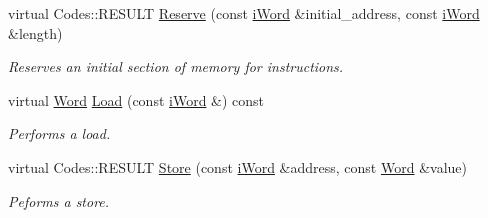\begin{DoxyCompactItemize}
\item 
virtual Codes::RESULT \hyperlink{classMemory_afe683401c1656b0a077d5f666f9c8d51}{Reserve} (const \hyperlink{classiWord}{iWord} \&initial\_\-address, const \hyperlink{classiWord}{iWord} \&length)
\begin{DoxyCompactList}\small\item\em Reserves an initial section of memory for instructions. \item\end{DoxyCompactList}\item 
virtual \hyperlink{classWord}{Word} \hyperlink{classMemory_af043b481b061644f9ff6cd7288655c93}{Load} (const \hyperlink{classiWord}{iWord} \&) const 
\begin{DoxyCompactList}\small\item\em Performs a load. \item\end{DoxyCompactList}\item 
virtual Codes::RESULT \hyperlink{classMemory_a100745221ade9b322743514d91fcce23}{Store} (const \hyperlink{classiWord}{iWord} \&address, const \hyperlink{classWord}{Word} \&value)
\begin{DoxyCompactList}\small\item\em Peforms a store. \item\end{DoxyCompactList}\end{DoxyCompactItemize}
